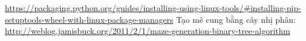 \documentclass[a4paper,12pt]{article}
\begin{document}
\renewcommand{\refname}{D. TÀI LIỆU THAM KHẢO}
\begin{thebibliography}{99}
   \url{https://packaging.python.org/guides/installing-using-linux-tools/\#installing-pip-setuptools-wheel-with-linux-package-managers}
   Tạo mê cung bằng cây nhị phân:
  \url{http://weblog.jamisbuck.org/2011/2/1/maze-generation-binary-tree-algorithm}
\end{thebibliography}


\end{document}
